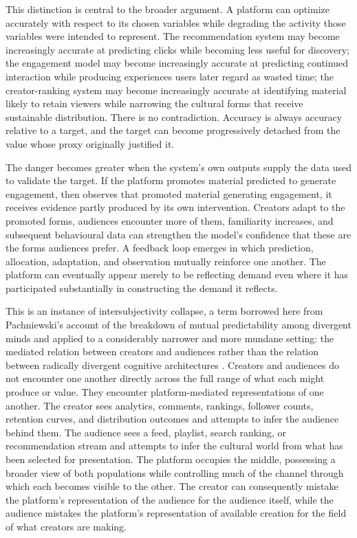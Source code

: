 \documentclass[11pt]{article}
\begin{document}
This distinction is central to the broader argument. A platform can optimize accurately with respect to its chosen variables while degrading the activity those variables were intended to represent. The recommendation system may become increasingly accurate at predicting clicks while becoming less useful for discovery; the engagement model may become increasingly accurate at predicting continued interaction while producing experiences users later regard as wasted time; the creator-ranking system may become increasingly accurate at identifying material likely to retain viewers while narrowing the cultural forms that receive sustainable distribution. There is no contradiction. Accuracy is always accuracy relative to a target, and the target can become progressively detached from the value whose proxy originally justified it.

The danger becomes greater when the system's own outputs supply the data used to validate the target. If the platform promotes material predicted to generate engagement, then observes that promoted material generating engagement, it receives evidence partly produced by its own intervention. Creators adapt to the promoted forms, audiences encounter more of them, familiarity increases, and subsequent behavioural data can strengthen the model's confidence that these are the forms audiences prefer. A feedback loop emerges in which prediction, allocation, adaptation, and observation mutually reinforce one another. The platform can eventually appear merely to be reflecting demand even where it has participated substantially in constructing the demand it reflects.

This is an instance of intersubjectivity collapse, a term borrowed here from Pachniewski's account of the breakdown of mutual predictability among divergent minds and applied to a considerably narrower and more mundane setting: the mediated relation between creators and audiences rather than the relation between radically divergent cognitive architectures \citep{pachniewski2023intersubjectivity}. Creators and audiences do not encounter one another directly across the full range of what each might produce or value. They encounter platform-mediated representations of one another. The creator sees analytics, comments, rankings, follower counts, retention curves, and distribution outcomes and attempts to infer the audience behind them. The audience sees a feed, playlist, search ranking, or recommendation stream and attempts to infer the cultural world from what has been selected for presentation. The platform occupies the middle, possessing a broader view of both populations while controlling much of the channel through which each becomes visible to the other. The creator can consequently mistake the platform's representation of the audience for the audience itself, while the audience mistakes the platform's representation of available creation for the field of what creators are making.
\end{document}
